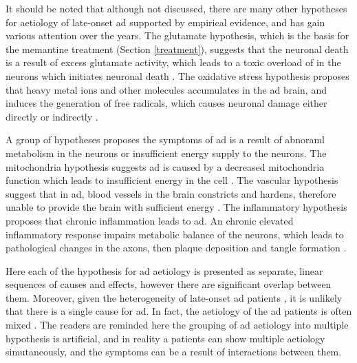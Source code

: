 It should be noted that although not discussed, there are many other hypotheses for aetiology of late-onset \gls{ad} supported by empirical evidence, and has gain various attention over the years. The glutamate hypothesis, which is the basis for the memantine treatment (Section \ref{treatment}), suggests that the neuronal death is a result of excess glutamate activity, which leads to a toxic overload of  in the neurons which initiates neuronal death \citep{greenamyre88, parsons07}. The oxidative stress hypothesis proposes that heavy metal ions and other molecules accumulates in the \gls{ad} brain, and induces the generation of free radicals, which causes neuronal damage either directly or indirectly \citep{markesbery97, smith10}. 

A group of hypotheses proposes the symptoms of \gls{ad} is a result of abnoraml metabolism in the neurons or insufficient energy supply to the neurons. The mitochondria hypothesis suggests \gls{ad} is caused by a decreased mitochondria function which leads to insufficient energy in the cell \citep{zhu06a, swerdlow14}. The vascular hypothesis suggest that in \gls{ad}, blood vessels in the brain constricts and hardens, therefore unable to provide the brain with sufficient energy \citep{luchsinger05, mamelak17}. The inflammatory hypothesis proposes that chronic inflammation leads to \gls{ad}. An chronic elevated inflammatory response impairs metabolic balance of the neurons, which leads to pathological changes in the axons, then plaque deposition and tangle formation \citep{krstic13}. 

Here each of the hypothesis for \gls{ad} aetiology is presented as separate, linear sequences of causes and effects, however there are significant overlap between them. Moreover, given the heterogeneity of late-onset \gls{ad} patients \citep{komarova11, tschanz11}, it is unlikely that there is a single cause for \gls{ad}. In fact, the aetiology of the \gls{ad} patients is often mixed \citep{schneider07}. The readers are reminded here the grouping of \gls{ad} aetiology into multiple hypothesis is artificial, and in reality a patients can show multiple aetiology simutaneously, and the symptoms can be a result of interactions between them. 

